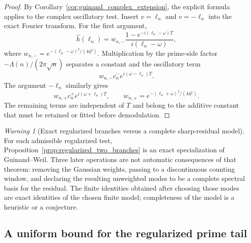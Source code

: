 \documentclass[11pt]{amsart}
\numberwithin{equation}{section}
\theoremstyle{plain}
\theoremstyle{definition}
\theoremstyle{remark}
\newtheorem{warning}[theorem]{Warning}
\newcommand{\1}{\mathbf{1}}
\begin{document}
\begin{proof}
By Corollary~\ref{cor:guinand_complex_extension}, the explicit formula
applies to the complex oscillatory test.  Insert \(v=\ell_n\) and
\(v=-\ell_n\) into the exact Fourier transform.
For the first argument,
\begin{equation}
\widehat h(\ell_n)
=
w_{n,-}
\frac{1-e^{-i(\ell_n-\omega)T}}
{i(\ell_n-\omega)},
\label{eq:branch_minus_fourier_insert}
\end{equation}
where \(w_{n,-}=e^{-(\ell_n-\omega)^2/(4\eta^2)}\).  Multiplication by the
prime-side factor \(-\Lambda(n)/(2\pi\sqrt n)\) separates a constant and
the oscillatory term
\begin{equation}
w_{n,-}c_n^-e^{i(\omega-\ell_n)T}.
\label{eq:branch_minus_oscillatory_proof}
\end{equation}
The argument \(-\ell_n\) similarly gives
\begin{equation}
w_{n,+}c_n^+e^{i(\omega+\ell_n)T},
\qquad
w_{n,+}=e^{-(\ell_n+\omega)^2/(4\eta^2)}.
\label{eq:branch_plus_oscillatory_proof}
\end{equation}
The remaining terms are independent of \(T\) and belong to the additive
constant that must be retained or fitted before demodulation.
\end{proof}

\begin{warning}[Exact regularized branches versus a complete sharp-residual model]
\label{warn:regularized_exact_sharp_extrapolation}
For each admissible regularized test, Proposition~\ref{prop:regularized_two_branches}
is an exact specialization of Guinand--Weil.  Three later operations are not
automatic consequences of that theorem: removing the Gaussian weights,
passing to a discontinuous counting window, and declaring the resulting
unweighted modes to be a complete spectral basis for the residual.  The
finite identities obtained after choosing those modes are exact identities
of the chosen finite model; completeness of the model is a heuristic or a
conjecture.
\end{warning}

\subsection{A uniform bound for the regularized prime tail}
\label{subsec:regularized_tail_bound}
\end{document}
